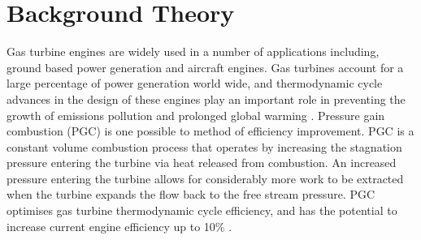 \section{Background Theory} \label{sec:background}
Gas turbine engines are widely used in a number of applications including, ground based power generation and aircraft engines. Gas turbines account for a large percentage of power generation world wide, and thermodynamic cycle advances in the design of these engines play an important role in preventing the growth of emissions pollution and prolonged global warming \cite{paxson2010}. Pressure gain combustion (PGC) is one possible to method of efficiency improvement. PGC is a constant volume combustion process that operates by increasing the stagnation pressure entering the turbine via heat released from combustion. An increased pressure entering the turbine allows for considerably more work to be extracted when the turbine expands the flow back to the free stream pressure. PGC optimises gas turbine thermodynamic cycle efficiency, and has the potential to increase current engine efficiency up to 10\% \cite{gulen2013}.

